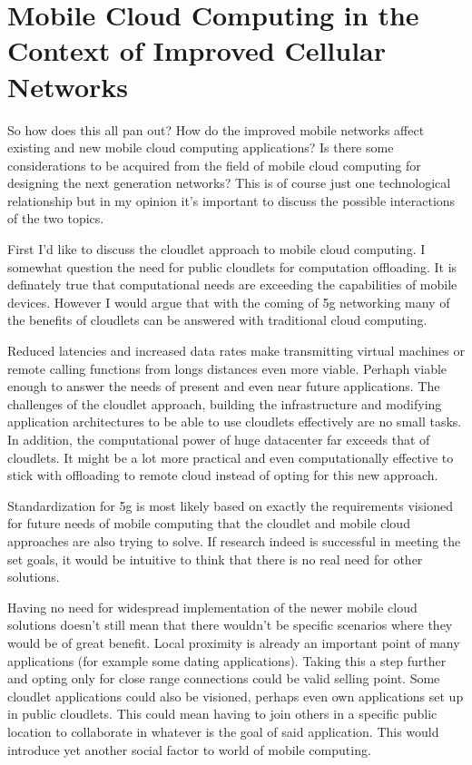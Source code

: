 \documentclass[conference]{IEEEtran}
\begin{document}
\section{Mobile Cloud Computing in the Context of Improved Cellular Networks}
So how does this all pan out? How do the improved mobile networks affect existing and new mobile cloud computing applications? Is there some considerations to be acquired from the field of mobile cloud computing for designing the next generation networks? This is of course just one technological relationship but in my opinion it's important to discuss the possible interactions of the two topics.
\par
First I'd like to discuss the cloudlet approach to mobile cloud computing. I somewhat question the need for public cloudlets for computation offloading. It is definately true that computational needs are exceeding the capabilities of mobile devices. However I would argue that with the coming of 5g networking many of the benefits of cloudlets can be answered with traditional cloud computing. 
\par
Reduced latencies and increased data rates make transmitting virtual machines or remote calling functions from longs distances even more viable. Perhaph viable enough to answer the needs of present and even near future applications. The challenges of the cloudlet approach, building the infrastructure and modifying application architectures to be able to use cloudlets effectively are no small tasks. In addition, the computational power of huge datacenter far exceeds that of cloudlets. It might be a lot more practical and even computationally effective to stick with offloading to remote cloud instead of opting for this new approach.
\par
Standardization for 5g is most likely based on exactly the requirements visioned for future needs of mobile computing that the cloudlet and mobile cloud approaches are also trying to solve. If research indeed is successful in meeting the set goals, it would be intuitive to think that there is no real need for other solutions.
\par
Having no need for widespread implementation of the newer mobile cloud solutions doesn't still mean that there wouldn't be specific scenarios where they would be of great benefit. Local proximity is already an important point of many applications (for example some dating applications). Taking this a step further and opting only for close range connections could be valid selling point. Some cloudlet applications could also be visioned, perhaps even own applications set up in public cloudlets. This could mean having to join others in a specific public location to collaborate in whatever is the goal of said application. This would introduce yet another social factor to world of mobile computing.
\end{document}
